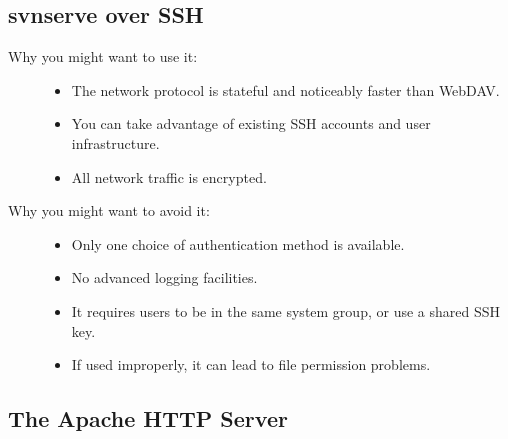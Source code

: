 \subsection{svnserve over SSH}\label{svn.serverconfig.choosing.svn-ssh}

\begin{description}
\item[Why you might want to use it:]
\hfill
\begin{itemize}
\item
  The network protocol is stateful and noticeably faster than WebDAV.
\item
  You can take advantage of existing SSH accounts and user
  infrastructure.
\item
  All network traffic is encrypted.
\end{itemize}
\item[Why you might want to avoid it:]
\hfill
\begin{itemize}
\item
  Only one choice of authentication method is available.
\item
  No advanced logging facilities.
\item
  It requires users to be in the same system group, or use a shared SSH
  key.
\item
  If used improperly, it can lead to file permission problems.
\end{itemize}
\end{description}

\subsection{The Apache HTTP
Server}\label{svn.serverconfig.choosing.apache}

